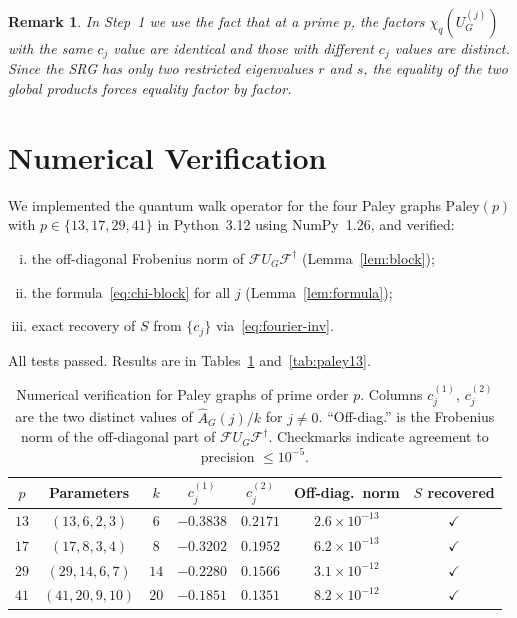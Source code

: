 \documentclass[12pt]{article}
\newtheorem{remark}[theorem]{Remark}
\newcommand{\Uj}{U_G^{(j)}}
\newcommand{\cF}{\mathcal{F}}
\begin{document}
\begin{remark}
  In Step~1 we use the fact that at a prime $p$, the factors
  $\chi_q(\Uj)$ with the same $c_j$ value are identical and those with
  different $c_j$ values are distinct.  Since the SRG has only two
  restricted eigenvalues $r$ and $s$, the equality of the two global
  products forces equality factor by factor.
\end{remark}

\section{Numerical Verification}
\label{sec:numerics}

We implemented the quantum walk operator for the four Paley graphs
$\mathrm{Paley}(p)$ with $p\in\{13,17,29,41\}$ in Python~3.12 using
NumPy~1.26, and verified:
\begin{enumerate}[(i)]
  \item the off-diagonal Frobenius norm of $\cF U_G\cF^\dagger$
        (Lemma~\ref{lem:block});
  \item the formula~\eqref{eq:chi-block} for all $j$
        (Lemma~\ref{lem:formula});
  \item exact recovery of $S$ from $\{c_j\}$ via~\eqref{eq:fourier-inv}.
\end{enumerate}
All tests passed.  Results are in Tables~\ref{tab:verification}
and~\ref{tab:paley13}.

\begin{table}[ht]
\centering
\caption{Numerical verification for Paley graphs of prime order $p$.
  Columns $c_j^{(1)}$, $c_j^{(2)}$ are the two distinct values of
  $\widehat{A}_G(j)/k$ for $j\neq 0$.  ``Off-diag.'' is the Frobenius
  norm of the off-diagonal part of $\cF U_G\cF^\dagger$.  Checkmarks
  indicate agreement to precision $\leq 10^{-5}$.}
\label{tab:verification}
\begin{tabular}{ccccccc}
\toprule
$p$ & Parameters & $k$ & $c_j^{(1)}$ & $c_j^{(2)}$ &
Off-diag.\ norm & $S$ recovered \\
\midrule
$13$ & $(13,6,2,3)$   & $6$  & $-0.3838$ & $0.2171$
     & $2.6\times10^{-13}$ & $\checkmark$ \\
$17$ & $(17,8,3,4)$   & $8$  & $-0.3202$ & $0.1952$
     & $6.2\times10^{-13}$ & $\checkmark$ \\
$29$ & $(29,14,6,7)$  & $14$ & $-0.2280$ & $0.1566$
     & $3.1\times10^{-12}$ & $\checkmark$ \\
$41$ & $(41,20,9,10)$ & $20$ & $-0.1851$ & $0.1351$
     & $8.2\times10^{-12}$ & $\checkmark$ \\
\bottomrule
\end{tabular}
\end{table}
\end{document}
